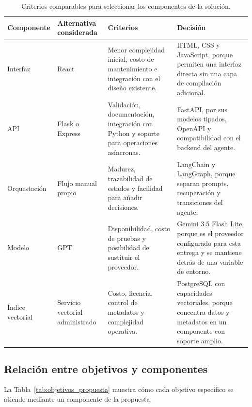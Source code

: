 \begin{table}[htbp]
\centering
\caption{Criterios comparables para seleccionar los componentes de la solución.}
\label{tab:seleccion_tecnologica}
\begin{tabular}{p{}p{}p{}p{}}
\toprule
\textbf{Componente} & \textbf{Alternativa considerada} & \textbf{Criterios} & \textbf{Decisión}\\
\midrule
Interfaz & React & Menor complejidad inicial, costo de mantenimiento e integración con el diseño existente. & HTML, CSS y JavaScript, porque permiten una interfaz directa sin una capa de compilación adicional.\\
API & Flask o Express & Validación, documentación, integración con Python y soporte para operaciones asíncronas. & FastAPI, por sus modelos tipados, OpenAPI y compatibilidad con el backend del agente.\\
Orquestación & Flujo manual propio & Madurez, trazabilidad de estados y facilidad para añadir decisiones. & LangChain y LangGraph, porque separan prompts, recuperación y transiciones del agente.\\
Modelo & GPT & Disponibilidad, costo de pruebas y posibilidad de sustituir el proveedor. & Gemini 3.5 Flash Lite, porque es el proveedor configurado para esta entrega y se mantiene detrás de una variable de entorno.\\
Índice vectorial & Servicio vectorial administrado & Costo, licencia, control de metadatos y complejidad operativa. & PostgreSQL con capacidades vectoriales, porque concentra datos y metadatos en un componente con soporte amplio.\\
\bottomrule
\end{tabular}
\end{table}

\subsection{Relación entre objetivos y componentes}

La Tabla~\ref{tab:objetivos_propuesta} muestra cómo cada objetivo específico se atiende mediante un componente de la propuesta.

